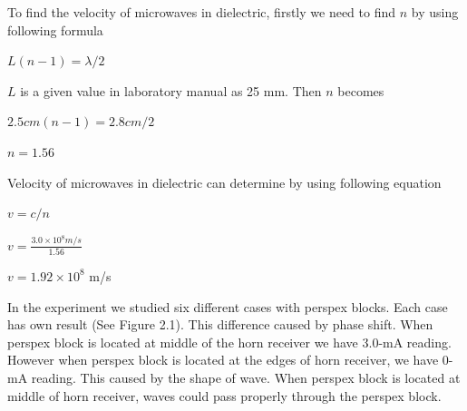 \documentclass[a4paper,12pt]{report}
\begin{document}
To find the velocity of microwaves in dielectric, firstly we need to find $n$ by using following formula
\begin{center}
	$L(n-1)=\lambda/2$
\end{center}
$L$ is a given value in laboratory manual as 25 mm. Then $n$ becomes
\begin{center}
	$2.5cm(n-1)=2.8cm/2$
\end{center}
\begin{center}
	$n=1.56$
\end{center}
Velocity of microwaves in dielectric can determine by using following equation
\begin{center}
	$v=c/n$
\end{center}
\begin{center}
	$v=\frac{3.0\times10^{8}m/s}{1.56}$
\end{center}
\begin{center}
	$v=1.92\times10^{8}$ m/s
\end{center}
In the experiment we studied six different cases with perspex blocks. Each case has own result (See Figure 2.1). This difference caused by phase shift. When perspex block is located at middle of the horn receiver we have 3.0-mA reading. However when perspex block is located at the edges of horn receiver, we have 0-mA reading. This caused by the shape of wave. When perspex block is located at middle of horn receiver, waves could pass properly through the perspex block.
\end{document}
